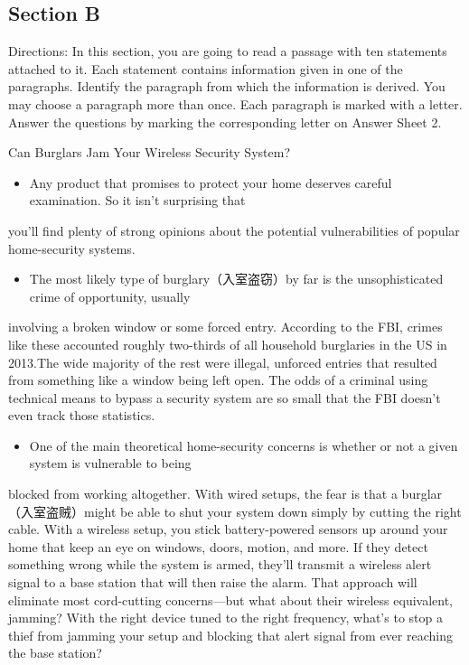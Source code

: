 \documentclass[UTF8,11pt]{ctexart}
\begin{document}
\subsection*{\textbf{Section B}}


Directions: In this section, you are going to read a passage with ten statements attached to it. Each statement contains information given in one of the paragraphs. Identify the paragraph from which the information is derived. You may choose a paragraph more than once. Each paragraph is marked with a letter. Answer the questions by marking the corresponding letter on Answer Sheet 2.


Can Burglars Jam Your Wireless Security System?


\begin{itemize}[leftmargin=2em,itemsep=.2em,topsep=.4em]\item[A.] Any product that promises to protect your home deserves careful examination. So it isn't surprising that
\end{itemize}

you'll find plenty of strong opinions about the potential vulnerabilities of popular home-security systems.


\begin{itemize}[leftmargin=2em,itemsep=.2em,topsep=.4em]\item[B.] The most likely type of burglary（入室盗窃）by far is the unsophisticated crime of opportunity, usually
\end{itemize}

involving a broken window or some forced entry. According to the FBI, crimes like these accounted roughly two-thirds of all household burglaries in the US in 2013.The wide majority of the rest were illegal, unforced entries that resulted from something like a window being left open. The odds of a criminal using technical means to bypass a security system are so small that the FBI doesn't even track those statistics.


\begin{itemize}[leftmargin=2em,itemsep=.2em,topsep=.4em]\item[C.] One of the main theoretical home-security concerns is whether or not a given system is vulnerable to being
\end{itemize}

blocked from working altogether. With wired setups, the fear is that a burglar（入室盗贼）might be able to shut your system down simply by cutting the right cable. With a wireless setup, you stick battery-powered sensors up around your home that keep an eye on windows, doors, motion, and more. If they detect something wrong while the system is armed, they'll transmit a wireless alert signal to a base station that will then raise the alarm. That approach will eliminate most cord-cutting concerns—but what about their wireless equivalent, jamming? With the right device tuned to the right frequency, what's to stop a thief from jamming your setup and blocking that alert signal from ever reaching the base station?
\end{document}
